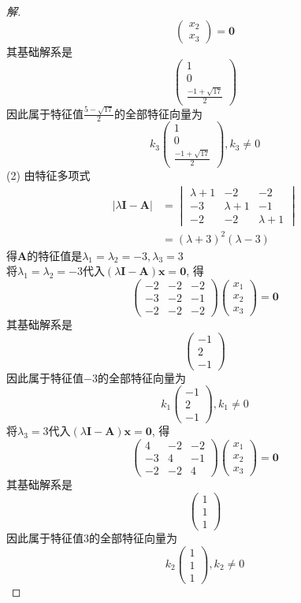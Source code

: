 \documentclass[10pt,a4paper]{report}
\def\*#1{\mathbf{#1}}
\begin{document}
\begin{proof}[解]
\[\begin{pmatrix}
	x_2 \\
	x_3
	\end{pmatrix} = \*0 \]
	其基础解系是
	\[ \begin{pmatrix}
	1 \\
	0 \\
	\frac{-1+\sqrt{17}}{2}
	\end{pmatrix} \]
	因此属于特征值$\frac{5-\sqrt{17}}{2}$的全部特征向量为
	\[ k_3 \begin{pmatrix}
	1 \\
	0 \\
	\frac{-1+\sqrt{17}}{2}
	\end{pmatrix}, k_3\neq 0 \]
	(2) 由特征多项式
	\begin{align*}
	|\lambda \*I - \*A | &= \begin{vmatrix}
	\lambda +1 & -2 & -2 \\
	-3 & \lambda +1 & -1 \\
	-2 & -2 & \lambda +1
	\end{vmatrix} \\
	&= (\lambda + 3)^{2}(\lambda-3)
	\end{align*}
	得$\*A$的特征值是$\lambda_1 = \lambda_2 = -3, \lambda_3 = 3$\\
	将$\lambda_1 = \lambda_2 = -3$代入$(\lambda\*I - \*A)\*x = \*0$, 得
	\[ \begin{pmatrix}
	-2 & -2 & -2 \\
	-3 & -2 & -1 \\
	-2 & -2 & -2
	\end{pmatrix}
	\begin{pmatrix}
	x_1 \\
	x_2 \\
	x_3
	\end{pmatrix} = \*0 \]
	其基础解系是
	\[ \begin{pmatrix}
	-1 \\
	2 \\
	-1
	\end{pmatrix} \]
	因此属于特征值$-3$的全部特征向量为
	\[ k_1 \begin{pmatrix}
	-1 \\
	2 \\
	-1
	\end{pmatrix}, k_1 \neq 0 \]
	将$\lambda_3 = 3$代入$(\lambda\*I - \*A)\*x = \*0$, 得
	\[ \begin{pmatrix}
	4 & -2 & -2 \\
	-3 & 4 & -1 \\
	-2 & -2 & 4
	\end{pmatrix}
	\begin{pmatrix}
	x_1 \\
	x_2 \\
	x_3
	\end{pmatrix} = \*0 \]
	其基础解系是
	\[ \begin{pmatrix}
	1 \\
	1 \\
	1
	\end{pmatrix} \]
	因此属于特征值$3$的全部特征向量为
	\[ k_2 \begin{pmatrix}
	1 \\
	1 \\
	1
	\end{pmatrix}, k_2 \neq 0 \]
	

\end{proof}
\end{document}
